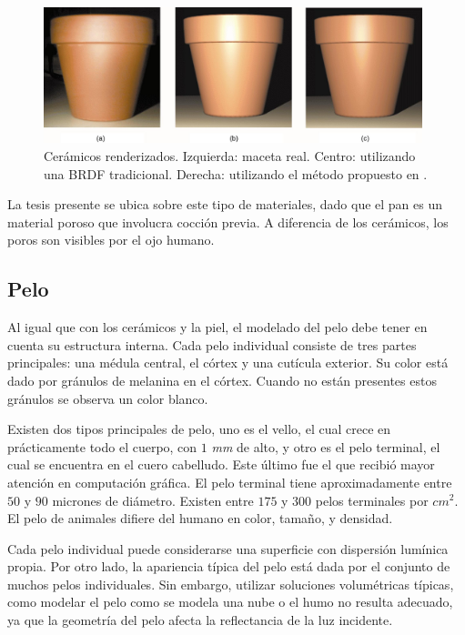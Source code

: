 \begin{figure}
\center
\includegraphics[width=11cm]{figures/ceramico}
\caption[Cerámicos renderizados]{Cerámicos renderizados. Izquierda: maceta real. Centro: utilizando una BRDF tradicional. Derecha: utilizando el método propuesto en \cite{Merillou2000}.}
\label{fg:ceramico}
\end{figure}

La tesis presente se ubica sobre este tipo de materiales, dado que el pan es un material poroso que involucra cocción previa.
A diferencia de los cerámicos, los poros son visibles por el ojo humano.

\subsection{Pelo}
Al igual que con los cerámicos y la piel, el modelado del pelo debe tener en cuenta su estructura interna.
Cada pelo individual consiste de tres partes principales: una médula central, el córtex y una cutícula exterior.
Su color está dado por gránulos de melanina en el córtex.
Cuando no están presentes estos gránulos se observa un color blanco.


Existen dos tipos principales de pelo, uno es el vello, el cual crece en prácticamente todo el cuerpo, con $1$ {\em mm} de alto, y otro es el pelo terminal, el cual se encuentra en el cuero cabelludo.
Este último fue el que recibió mayor atención en computación gráfica.
El pelo terminal tiene aproximadamente entre $50$ y $90$ micrones de diámetro.
Existen entre $175$ y $300$ pelos terminales por {\em $cm^{2}$}.
El pelo de animales difiere del humano en color, tamaño, y densidad.

Cada pelo individual puede considerarse una superficie con dispersión lumínica propia.
Por otro lado, la apariencia típica del pelo está dada por el conjunto de muchos pelos individuales.
Sin embargo, utilizar soluciones volumétricas típicas, como modelar el pelo como se modela una nube o el humo no resulta adecuado, ya que la geometría del pelo afecta la reflectancia de la luz incidente.

